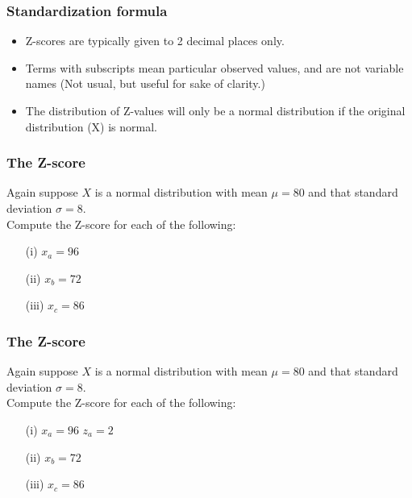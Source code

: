 \documentclass[a4]{beamer}
\begin{document}
\begin{frame}
\frametitle{Standardization formula}
\Large
\vspace{-1cm}
\begin{itemize}
\item Z-scores are typically given to 2 decimal places only.
\item Terms with subscripts mean particular observed values, and are not variable names (Not usual, but useful for sake of clarity.)
\item The distribution of Z-values will only be a normal distribution if the original distribution (X) is normal.
\end{itemize}
\end{frame}
\begin{frame}
\frametitle{The Z-score}
\Large
\vspace{-1cm}
Again suppose $X$ is a normal distribution with mean $\mu = 80 $ and that standard deviation $\sigma = 8$. \\ \vspace{0.5cm} Compute the Z-score for each of the following:
\begin{itemize}
\item[(i)] $x_a = 96$ \vspace{0.2cm}
\item[(ii)] $x_b = 72$ \vspace{0.2cm}
\item[(iii)] $x_c = 86$ 
\end{itemize}
\end{frame}
\begin{frame}
\frametitle{The Z-score}
\Large
\vspace{-1cm}
Again suppose $X$ is a normal distribution with mean $\mu = 80 $ and that standard deviation $\sigma = 8$. \\ \vspace{0.5cm} Compute the Z-score for each of the following:
\begin{itemize}
\item[(i)] $x_a = 96$  \phantom{space} $z_a = 2$ \vspace{0.2cm}
\item[(ii)] $x_b = 72$  %
\item[(iii)] $x_c = 86$  %
\end{itemize}
\end{frame}
\end{document}
